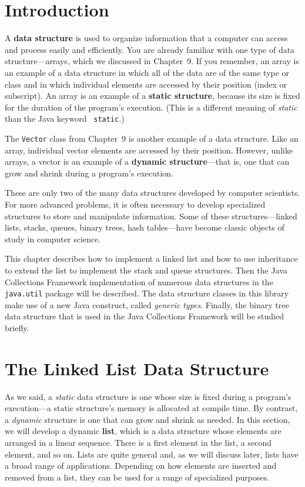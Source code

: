 \section{Introduction}
\label{introduction}
\noindent A {\bf data structure} is used to
organize information that a computer can access and process easily and
efficiently.  You are already familiar with one type of data
structure---arrays, which we discussed in Chapter~9.  If you remember,
an array is an example of a data structure in which all of the data
are of the same type or class and in which individual elements are
accessed by their position (index or subscript). An array is an
example of a {\bf static structure}, because
its size is fixed for the duration of the program's execution.  (This
is a different meaning of {\it static} than the Java keyword {\tt
static}.)

The {\tt Vector} class from Chapter~9 is another example
of a data structure.  Like an array, individual vector elements are
accessed by their position.  However, unlike arrays, a vector is an
example of a {\bf dynamic structure}---that
is, one that can grow and shrink during a program's execution.

These are only two of the many data structures developed by computer
scientists.   For more advanced problems, it is often necessary to
develop specialized structures to store and manipulate
information.  Some of these structures---linked lists, stacks,
queues, binary trees, hash tables---have become classic objects
of study in computer science.

This chapter describes how to implement a linked list and how to use
inheritance to extend the list to implement the stack and queue
structures. Then the Java Collections Framework implementation of
numerous data structures in the {\tt java.util} package will be
described.  The data structure classes in this library make use of a
new Java construct, called {\em generic types}.  Finally, the binary
tree data structure that is used in the Java Collections Framework
will be studied briefly.

\section{The Linked List Data Structure}
\label{the-linked-list-data-structure}
\noindent As we said, a {\it static} data structure is one whose size is fixed
during a program's execution---a static structure's memory is allocated at compile
time.  By contrast, a {\it dynamic} structure is one that can grow and
shrink as needed.  In this section, we will develop a dynamic {\bf
list}, which is a data structure whose elements are
arranged in a linear sequence.  There is a first element in the list,
a second element, and so on.  Lists are quite general and, as we will
discuss later, lists have a broad range of applications.  Depending on
how elements are inserted and removed from a list, they can be used
for a range of specialized purposes.

